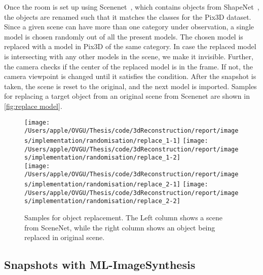 Once the room is set up using Scenenet~\cite{McCormac:etal:ICCV2017}, which contains objects from ShapeNet~\cite{chang2015shapenet}, the objects are renamed such that it matches the classes for the Pix3D dataset.
Since a given scene can have more than one category under observation, a single model is chosen randomly out of all the present models.
The chosen model is replaced with a model in Pix3D of the same category.
In case the replaced model is intersecting with any other models in the scene, we make it invisible.
Further, the camera checks if the center of the replaced model is in the frame.
If not, the camera viewpoint is changed until it satisfies the condition.
After the snapshot is taken, the scene is reset to the original, and the next model is imported.
Samples for replacing a target object from an original scene from Scenenet are shown in \autoref{fig:replace model}.

\begin{figure}
    \centering
        \texttt{[image: /Users/apple/OVGU/Thesis/code/3dReconstruction/report/images/implementation/randomisation/replace\_1-1]}
        \texttt{[image: /Users/apple/OVGU/Thesis/code/3dReconstruction/report/images/implementation/randomisation/replace\_1-2]} \\
        \vspace{0.1cm}
        \texttt{[image: /Users/apple/OVGU/Thesis/code/3dReconstruction/report/images/implementation/randomisation/replace\_2-1]}
        \texttt{[image: /Users/apple/OVGU/Thesis/code/3dReconstruction/report/images/implementation/randomisation/replace\_2-2]}\\
    \caption{Samples for object replacement. The Left column shows a scene from SceneNet, while the right column shows an object being replaced in original scene.}
    \label{fig:replace model}
\end{figure}

\subsection{Snapshots with ML-ImageSynthesis}\label{subsec:snapshots-with-ml-imagesynthesis}

